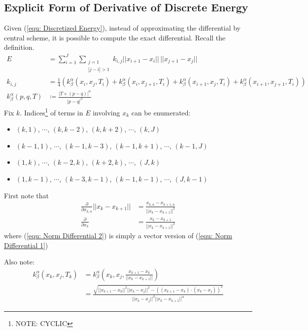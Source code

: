 \documentclass[a4paper, 11pt]{article}
\newcommand{\norm}[1]{||#1||}
\theoremstyle{definition}
\theoremstyle{remark}
\begin{document}
\subsection{Explicit Form of Derivative of Discrete Energy}
Given (\ref{equ: Discretized Energy}), instead of approximating the differential by central scheme,
it is possible to compute the exact differential.
Recall the definition.
\begin{align}
    E &= \sum_{i = 1}^{J} \sum_{\substack{j = 1 \\ |j-i| > 1}} k_{i,j} \norm{x_{i+1} - x_i} \, \norm{x_{j+1} - x_j} 
    \\
    k_{i,j} &= \frac{1}{4} \left( 
        k_{\beta}^{\alpha} \left( x_i, x_j, T_i \right)
        + k_{\beta}^{\alpha} \left( x_i, x_{j+1}, T_i \right)
        + k_{\beta}^{\alpha} \left( x_{i+1}, x_j, T_i \right)
        + k_{\beta}^{\alpha} \left( x_{i+1}, x_{j+1}, T_i \right)
    \right)
    \\
    k_{\beta}^{\alpha} \left( p, q, T \right) &\coloneqq \frac{|T \times \left( p-q \right)|^\alpha}{|p-q|^{\beta}}
\end{align}
Fix $k$. Indices\footnote{NOTE: CYCLIC} of terms in $E$ involving $x_k$ can be enumerated:
\begin{itemize}
    \item $(k,1)$, $\cdots$, $(k, k-2)$, $(k, k+2)$, $\cdots$, $(k,J)$
    \item $(k-1,1)$, $\cdots$, $(k-1, k-3)$, $(k-1, k+1)$, $\cdots$, $(k-1,J)$
    \item $(1,k)$, $\cdots$, $(k-2, k)$, $(k+2, k)$, $\cdots$, $(J,k)$
    \item $(1,k-1)$, $\cdots$, $(k-3, k-1)$, $(k-1, k-1)$, $\cdots$, $(J,k-1)$
\end{itemize}

First note that 
\begin{align}
    \frac{\partial}{\partial x_{k,n}} \norm{x_k - x_{k+1}} &= \frac{x_{k,n} - x_{k+1,n}}{\norm{x_k - x_{k+1}}^2}
    \label{equ: Norm Differential 1} \\
    \frac{\partial}{\partial x_k} &= \frac{x_k - x_{k+1}}{\norm{x_k - x_{k+1}}^2}
    \label{equ: Norm Differential 2}
\end{align}
where (\ref{equ: Norm Differential 2}) is simply a vector version of (\ref{equ: Norm Differential 1})

Also note:
\begin{align}
    k_{\beta}^{\alpha} \left( x_k, x_j, T_k \right) &= k_{\beta}^{\alpha} \left( x_k, x_j, \frac{x_{k+1} - x_{k}}{\norm{x_{k} - x_{k+1}}} \right)
    \\
    &= \frac{\sqrt{\norm{x_{k+1} - x_k}^2 \norm{x_k - x_j}^2- \left( \left( x_{k+1} - x_{k} \right) \cdot \left( x_{k} - x_{j} \right) \right)^2} }{\norm{x_k - x_j}^{\beta} \norm{x_k - x_{k+1}}^{\alpha}}
\end{align}
\end{document}
